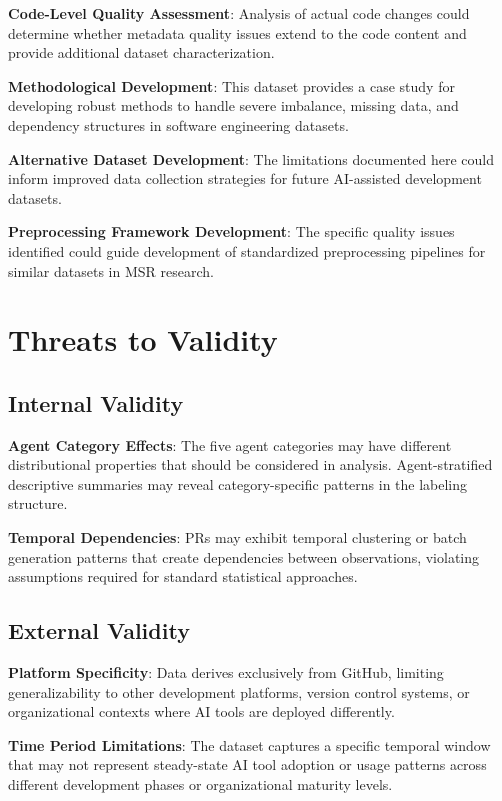\documentclass[conference]{IEEEtran}
\begin{document}
\textbf{Code-Level Quality Assessment}: Analysis of actual code changes could determine whether metadata quality issues extend to the code content and provide additional dataset characterization.

\textbf{Methodological Development}: This dataset provides a case study for developing robust methods to handle severe imbalance, missing data, and dependency structures in software engineering datasets.

\textbf{Alternative Dataset Development}: The limitations documented here could inform improved data collection strategies for future AI-assisted development datasets.

\textbf{Preprocessing Framework Development}: The specific quality issues identified could guide development of standardized preprocessing pipelines for similar datasets in MSR research.

\section{Threats to Validity}

\subsection{Internal Validity}

\textbf{Agent Category Effects}: The five agent categories may have different distributional properties that should be considered in analysis. Agent-stratified descriptive summaries may reveal category-specific patterns in the labeling structure.



\textbf{Temporal Dependencies}: PRs may exhibit temporal clustering or batch generation patterns that create dependencies between observations, violating assumptions required for standard statistical approaches.

\subsection{External Validity}

\textbf{Platform Specificity}: Data derives exclusively from GitHub, limiting generalizability to other development platforms, version control systems, or organizational contexts where AI tools are deployed differently.

\textbf{Time Period Limitations}: The dataset captures a specific temporal window that may not represent steady-state AI tool adoption or usage patterns across different development phases or organizational maturity levels.
\end{document}
